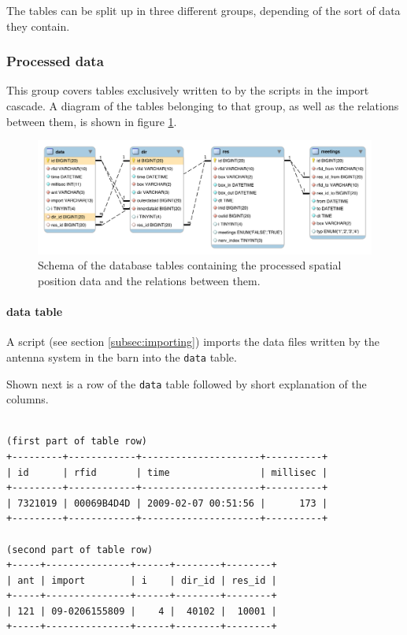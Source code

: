 The tables can be split up in three different groups, depending of the sort of data they contain. 

\subsubsection{Processed data}

This group covers tables exclusively written to by the scripts in the import cascade. A diagram of the tables belonging to that group, as well as the relations between them, is shown in figure \ref{fig:processed_data_schema}. 

\begin{figure}[htpb]
\begin{center}
  \includegraphics[width=\textwidth]{assets/pdf/processed_data_schema.pdf}
  \caption[Schema of database tables containing the processed data]{Schema of the database tables containing the processed spatial position data and the relations between them.}
  \label{fig:processed_data_schema}
\end{center}
\end{figure} 

\paragraph{data table}
\label{para:data_table}

A script (see section \ref{subsec:importing}) imports the data files written by the antenna system in the barn into the \lstinline|data| table.

Shown next is a row of the \lstinline|data| table followed by short explanation of the columns.

\codescript
{}
\begin{lstlisting}[frame=none]

(first part of table row)
+---------+------------+---------------------+----------+
| id      | rfid       | time                | millisec |
+---------+------------+---------------------+----------+
| 7321019 | 00069B4D4D | 2009-02-07 00:51:56 |      173 |
+---------+------------+---------------------+----------+

(second part of table row)
+-----+---------------+------+--------+--------+
| ant | import        | i    | dir_id | res_id |
+-----+---------------+------+--------+--------+
| 121 | 09-0206155809 |    4 |  40102 |  10001 |
+-----+---------------+------+--------+--------+

\end{lstlisting}

